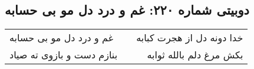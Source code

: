 \begin{center}
\section*{دوبیتی شماره ۲۲۰: غم و درد دل مو بی حسابه}
\label{sec:220}
\begin{longtable}{l p{0.5cm} r}
غم و درد دل مو بی حسابه
&&
خدا دونه دل از هجرت کبابه
\\
بنازم دست و بازوی ته صیاد
&&
بکش مرغ دلم بالله ثوابه
\\
\end{longtable}
\end{center}
